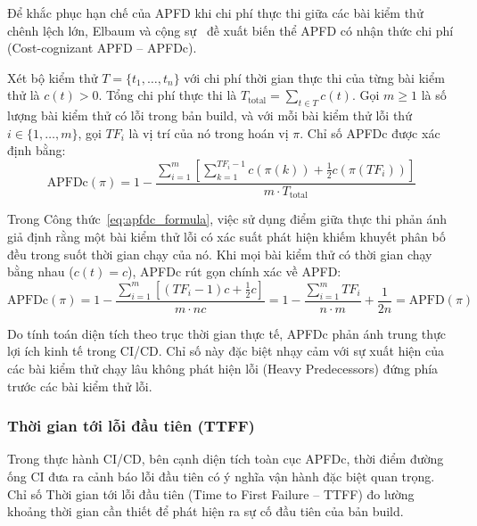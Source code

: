 Để khắc phục hạn chế của APFD khi chi phí thực thi giữa các bài kiểm thử chênh lệch lớn, Elbaum và cộng sự~\cite{elbaum2001incorporating, elbaum2002tcp} đề xuất biến thể APFD có nhận thức chi phí (Cost-cognizant APFD -- APFDc).

\begin{dn}
\label{def:apfdc_metric}
Xét bộ kiểm thử $T = \{t_1, \dots, t_n\}$ với chi phí thời gian thực thi của từng bài kiểm thử là $c(t) > 0$. Tổng chi phí thực thi là $T_{\text{total}} = \sum_{t \in T} c(t)$. Gọi $m \ge 1$ là số lượng bài kiểm thử có lỗi trong bản build, và với mỗi bài kiểm thử lỗi thứ $i \in \{1, \dots, m\}$, gọi $TF_i$ là vị trí của nó trong hoán vị $\pi$. Chỉ số APFDc được xác định bằng:
\begin{equation}
\label{eq:apfdc_formula}
\text{APFDc}(\pi) = 1 - \frac{\sum_{i=1}^m \left[ \sum_{k=1}^{TF_i-1} c(\pi(k)) + \frac{1}{2} c(\pi(TF_i)) \right]}{m \cdot T_{\text{total}}}
\end{equation}
\end{dn}

Trong Công thức~\eqref{eq:apfdc_formula}, việc sử dụng điểm giữa thực thi phản ánh giả định rằng một bài kiểm thử lỗi có xác suất phát hiện khiếm khuyết phân bố đều trong suốt thời gian chạy của nó. Khi mọi bài kiểm thử có thời gian chạy bằng nhau ($c(t) = c$), APFDc rút gọn chính xác về APFD:
\begin{equation}
\text{APFDc}(\pi) = 1 - \frac{\sum_{i=1}^m \left[ (TF_i - 1)c + \frac{1}{2}c \right]}{m \cdot n c} = 1 - \frac{\sum_{i=1}^m TF_i}{n \cdot m} + \frac{1}{2n} = \text{APFD}(\pi)
\end{equation}

Do tính toán diện tích theo trục thời gian thực tế, APFDc phản ánh trung thực lợi ích kinh tế trong CI/CD. Chỉ số này đặc biệt nhạy cảm với sự xuất hiện của các bài kiểm thử chạy lâu không phát hiện lỗi (Heavy Predecessors) đứng phía trước các bài kiểm thử lỗi.

\subsubsection{Thời gian tới lỗi đầu tiên (TTFF)}
\label{subsubsec:ttff_metric}

Trong thực hành CI/CD, bên cạnh diện tích toàn cục APFDc, thời điểm đường ống CI đưa ra cảnh báo lỗi đầu tiên có ý nghĩa vận hành đặc biệt quan trọng. Chỉ số Thời gian tới lỗi đầu tiên (Time to First Failure -- TTFF) đo lường khoảng thời gian cần thiết để phát hiện ra sự cố đầu tiên của bản build.

